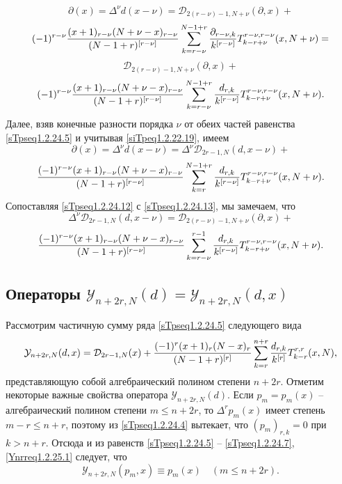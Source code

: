 $$\partial(x)=\Delta^\nu d(x-\nu)= \mathcal{D}_{2(r-\nu)-1,N+\nu}(\partial,x)+
$$
$$
(-1)^{r-\nu}
{(x+1)_{r-\nu}(N+\nu-x)_{r-\nu}\over (N-1+r)^{[r-\nu]}}
\sum_{k=r-\nu}^{N-1+r} {\partial_{r-\nu,k}\over
k^{[r-\nu]}}T_{k-r+\nu}^{r-\nu,r-\nu}(x,N+\nu)=
$$
$$
\mathcal{D}_{2(r-\nu)-1,N+\nu}(\partial,x)+
$$
\begin{equation}
\label{sTpseq1.2.24.12}
(-1)^{r-\nu}
{(x+1)_{r-\nu}(N+\nu-x)_{r-\nu}\over (N-1+r)^{[r-\nu]}}
\sum_{k=r-\nu}^{N-1+r} {d_{r,k}\over k^{[r-\nu]}}
T_{k-r+\nu}^{r-\nu,r-\nu}(x,N+\nu).
\end{equation}
Далее, взяв конечные разности  порядка $\nu$ от обеих частей равенства \eqref{sTpseq1.2.24.5} и
учитывая \eqref{siTpeq1.2.22.19}, имеем
$$
\partial(x)=\Delta^\nu d(x-\nu)=\Delta^\nu\mathcal{D}_{2r-1,N}(d,x-\nu)+
$$
\begin{equation}
\label{sTpseq1.2.24.13}
{(-1)^{r-\nu}
(x+1)_{r-\nu}(N+\nu-x)_{r-\nu}\over (N-1+r)^{[r-\nu]}}
\sum_{k=r}^{N-1+r} {d_{r,k}\over
k^{[r-\nu]}}T_{k-r+\nu}^{r-\nu,r-\nu}(x,N+\nu).
\end{equation}
Сопоставляя \eqref{sTpseq1.2.24.12} с \eqref{sTpseq1.2.24.13}, мы замечаем, что
$$
\Delta^\nu\mathcal{D}_{2r-1,N}(d,x-\nu)=\mathcal{D}_{2(r-\nu)-1,N+\nu}(\partial,x)+
$$
\begin{equation}
\label{sTpseq1.2.24.14}
{(-1)^{r-\nu}
(x+1)_{r-\nu}(N+\nu-x)_{r-\nu}\over (N-1+r)^{[r-\nu]}}
\sum_{k=r-\nu}^{r-1} {d_{r,k}\over k^{[r-\nu]}}
T_{k-r+\nu}^{r-\nu,r-\nu}(x,N+\nu).
\end{equation}




\subsection{Операторы $\mathcal{Y}_{n+2r,N}(d)=\mathcal{Y}_{n+2r,N}(d,x)$}



Рассмотрим частичную сумму ряда \eqref{sTpseq1.2.24.5} следующего вида
\begin{equation}
\label{Ynrreq1.2.25.1}
\mathcal{Y}_{n+2r,N}(d,x)=\mathcal{D}_{2r-1,N}(x)+{(-1)^r (x+1)_r(N-x)_r\over
(N-1+r)^{[r]}} \sum_{k=r}^{n+r} {d_{r,k}\over
k^{[r]}} T_{k-r}^{r,r}(x,N),
\end{equation}
представляющую собой алгебраический полином степени $n+2r$.  Отметим
некоторые важные свойства оператора $\mathcal{Y}_{n+2r,N}(d)$. Если
$p_m=p_m(x)$ -- алгебраический полином степени $m\le n+2r$, то
$\Delta^rp_{m}(x)$ имеет степень $m-r\le n+r$, поэтому из \eqref{sTpseq1.2.24.4}
вытекает, что   $(p_m)_{r,k}=0$ при $k>n+r$. Отсюда  и из равенств
\eqref{sTpseq1.2.24.5} -- \eqref{sTpseq1.2.24.7}, \eqref{Ynrreq1.2.25.1} следует, что
\begin{equation}
\label{Ynrreq1.2.25.2}
\mathcal{Y}_{n+2r,N}(p_m,x) \equiv p_m(x)\quad(m\le n+2r).
\end{equation}


